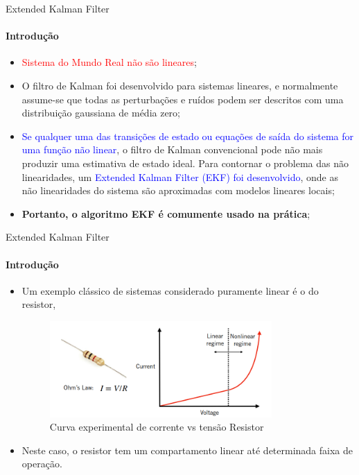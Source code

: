 \documentclass[aspectratio=169]{beamer}
\begin{document}
\begin{frame}[c]{Extended Kalman Filter}
    \framesubtitle{Introdução}
    \begin{itemize}
        \item \textcolor{red}{Sistema do Mundo Real não são lineares};
        \item O filtro de Kalman foi desenvolvido para sistemas lineares, e normalmente assume-se que todas as perturbações e ruídos podem ser descritos com uma distribuição gaussiana de média zero;
        \item \textcolor{blue}{Se qualquer uma das transições de estado ou equações de saída do sistema for uma função não linear}, o filtro de Kalman convencional pode não mais produzir uma estimativa de estado ideal. Para contornar o problema das não linearidades, um \textcolor{blue}{Extended Kalman Filter (EKF) foi desenvolvido}, onde as não linearidades do sistema são aproximadas com modelos lineares locais;
        \item \textbf{Portanto, o algoritmo EKF é comumente usado na prática};
    \end{itemize}

\end{frame}


\begin{frame}[c]{Extended Kalman Filter}
    \framesubtitle{Introdução}
    \begin{itemize}
        \item Um exemplo clássico de sistemas considerado puramente linear é o do resistor,


    \begin{figure}
        \centering
        \includegraphics[width=0.8\textwidth]{./images/resistor_curve.png}
        \caption{Curva experimental de corrente vs tensão Resistor}
    \end{figure}

        \item Neste caso, o resistor tem um compartamento linear até determinada faixa de operação.
    \end{itemize}
\end{frame}
\end{document}

